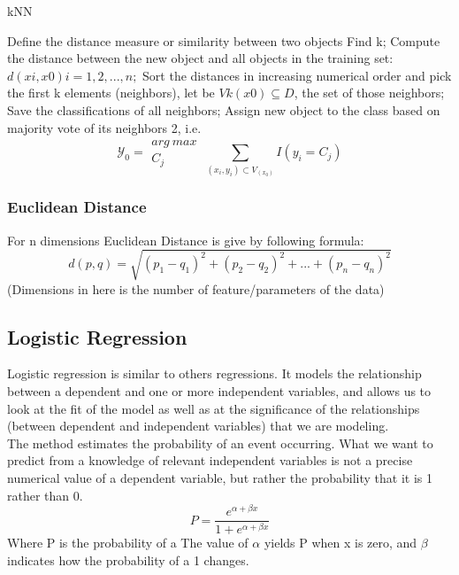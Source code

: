 \documentclass[twoside]{article}
\begin{document}
\begin{multicols}{2}
\begin{algorithm*}[t]
\caption{kNN} %
\label{alg:KNN}
\begin{algorithmic} [1]
    \State Define the distance measure or similarity between two objects \label{1}
    \State Find k; \label{KNN-fnd-k}
    \State Compute the distance between the new object and all objects in the training set: $d(xi, x0) i = 1, 2, . . . , n;$
	\State Sort the distances in increasing numerical order and pick the first k elements (neighbors), let be $Vk (x0) \subseteq D$, the set of those neighbors;
    \State Save the classifications of all neighbors;
    \State Assign new object to the class based on majority vote of its
neighbors 2, i.e.	\[	\mathcal{Y}_0 = \substack{arg\ max\ \\ C_j} \sum_{(x_i,y_i)\subset V_(x_0)} I(y_i=C_j) \]
\end{algorithmic}
\end{algorithm*}
\subsubsection*{Euclidean Distance}
For n dimensions Euclidean Distance is give by following formula:
\[ d(p,q)= \sqrt{(p_1 - q_1)^2 + (p_2 - q_2)^2 + ... + (p_n - q_n)^2} \]
(Dimensions in here is the number of feature/parameters of the data)

\subsection*{\textbf{Logistic Regression}}
\indent \par
Logistic regression is similar to others regressions. It models the relationship between a dependent and one or more independent variables, and allows us to look at the fit of the model as well as at the significance of the relationships (between dependent and independent variables) that we are modeling.\\
The method estimates the probability of an event occurring. What we want to predict from a knowledge of relevant independent variables is not a precise numerical value of a dependent variable, but rather the probability that it is 1 rather than 0.\\
\[P=\frac{e^{\alpha+\beta x}}{1+e^{\alpha+\beta x}}\]
Where P is the probability of a The value of $\alpha$ yields P when x is zero, and $\beta$ indicates how the probability of a 1 changes.\\


\end{multicols}
\end{document}
